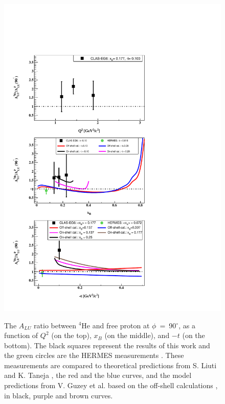 \begin{figure}[tp]
\centering
\includegraphics[scale=0.9]{fig_Dec2016/Coherent_ALU_ratio.pdf}\\
\caption{The $A_{LU}$ ratio between $^4$He and free proton at 
   $\phi$~=~90$^{\circ}$, as a function of $Q^2$ (on the top), $x_B$ (on the 
   middle), and $-t$ (on the bottom). The black squares represent the results 
   of this work and the green circles are the HERMES measurements 
   \cite{HERMES_BSA}. These measurements are compared to theoretical 
   predictions from S. Liuti and K. Taneja \cite{simonetta_2}, the red and the 
   blue curves, and the model predictions from V. Guzey et al. based on the 
off-shell calculations \cite{EMC_vadim_4}, in black, purple and brown curves.}
\label{fig:coh_EMC_ratio_ALU}
\end{figure}

  
